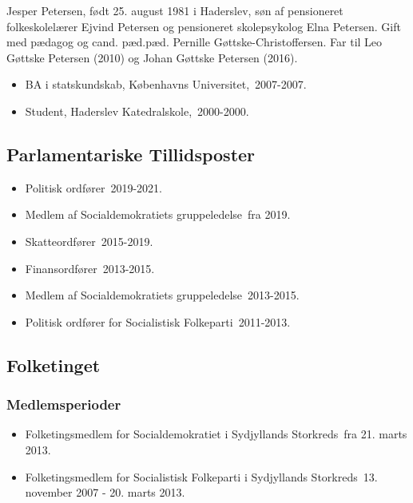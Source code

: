 \documentclass[11pt, a4paper]{awesome-cv}
\begin{document}
\makecvheader[R]
\makelettertitle
\begin{cvletter}
Jesper Petersen, født 25. august 1981 i Haderslev, søn af pensioneret folkeskolelærer Ejvind Petersen og pensioneret skolepsykolog Elna Petersen. Gift med pædagog og cand. pæd.pæd. Pernille Gøttske-Christoffersen. Far til Leo Gøttske Petersen (2010) og Johan Gøttske Petersen (2016).

\begin{itemize}
\item BA i statskundskab, Københavns Universitet, 2007-2007.
\item Student, Haderslev Katedralskole, 2000-2000.
\end{itemize}
\subsection*{Parlamentariske Tillidsposter}
\begin{itemize}
\item Politisk ordfører 2019-2021.
\item Medlem af Socialdemokratiets gruppeledelse fra 2019.
\item Skatteordfører 2015-2019.
\item Finansordfører 2013-2015.
\item Medlem af Socialdemokratiets gruppeledelse 2013-2015.
\item Politisk ordfører for Socialistisk Folkeparti 2011-2013.
\end{itemize}
\subsection*{Folketinget}
\subsubsection*{Medlemsperioder}
\begin{itemize}
\item Folketingsmedlem for Socialdemokratiet i Sydjyllands Storkreds fra 21. marts 2013.
\item Folketingsmedlem for Socialistisk Folkeparti i Sydjyllands Storkreds 13. november 2007 - 20. marts 2013.
\end{itemize}

\end{cvletter}
\end{document}
